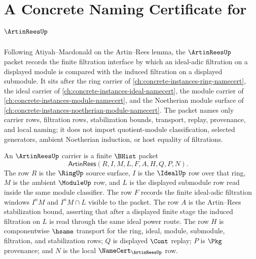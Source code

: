 \chapter{A Concrete Naming Certificate for $\ArtinReesUp$}
\label{ch:concrete-instances-artin-rees-namecert}

Following Atiyah--Macdonald on the Artin--Rees lemma, the $\ArtinReesUp$ packet records the finite filtration interface by which an ideal-adic filtration on a displayed module is compared with the induced filtration on a displayed submodule. It sits after the ring carrier of \autoref{ch:concrete-instances-ring-namecert}, the ideal carrier of \autoref{ch:concrete-instances-ideal-namecert}, the module carrier of \autoref{ch:concrete-instances-module-namecert}, and the Noetherian module surface of \autoref{ch:concrete-instances-noetherian-module-namecert}. The packet names only carrier rows, filtration rows, stabilization bounds, transport, replay, provenance, and local naming; it does not import quotient-module classification, selected generators, ambient Noetherian induction, or host equality of filtrations.

\begin{definition}
\label{def:artin-rees-carrier}
An $\ArtinReesUp$ carrier is a finite $\BHist$ packet
$$
\mathsf{ArtinRees}(R,I,M,L,F,A,H,Q,P,N).
$$
The row $R$ is the $\RingUp$ source surface, $I$ is the $\IdealUp$ row over that ring, $M$ is the ambient $\ModuleUp$ row, and $L$ is the displayed submodule row read inside the same module classifier. The row $F$ records the finite ideal-adic filtration windows $I^nM$ and $I^nM\cap L$ visible to the packet. The row $A$ is the Artin--Rees stabilization bound, asserting that after a displayed finite stage the induced filtration on $L$ is read through the same ideal power route. The row $H$ is componentwise $\hsame$ transport for the ring, ideal, module, submodule, filtration, and stabilization rows; $Q$ is displayed $\Cont$ replay; $P$ is $\Pkg$ provenance; and $N$ is the local $\NameCert_{\ArtinReesUp}$ row.
\end{definition}

